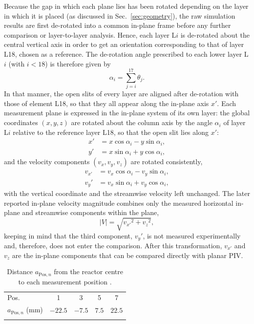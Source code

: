 Because the gap in which each plane lies has been rotated depending on the layer in which it is placed (as discussed in Sec.~\ref{sec:geometry}), the raw simulation results are first de-rotated into a common in-plane frame before any further comparison or layer-to-layer analysis. Hence, each layer L$i$ is de-rotated about the central vertical axis in order to get an orientation corresponding to that of layer L18, chosen as a reference. The de-rotation angle prescribed to each lower layer L$i$ (with $i<18$) is therefore given by
\begin{equation}
    \alpha_i = \sum_{j=i}^{17}\theta_j.
    \label{eq:derotation}
\end{equation}
In that manner, the open slits of every layer are aligned after de-rotation with those of element L18, so that they all appear along the in-plane axis $x'$.
Each measurement plane is expressed in the in-plane system of its own layer: the global coordinates $(x,y,z)$ are rotated about the column axis by the angle $\alpha_i$ of layer L$i$ relative to the reference layer L18, so that the open slit lies along $x'$:
\begin{subequations}
\label{eq:transform}
\begin{align}
    x' &= x\cos\alpha_i - y\sin\alpha_i, \\
    y' &= x\sin\alpha_i + y\cos\alpha_i,
\end{align}
\end{subequations}
and the velocity components $(v_x, v_y, v_z)$ are rotated consistently,
\begin{subequations}
\label{eq:transform_vel}
\begin{align}
    v_{x'} &= v_x\cos\alpha_i - v_y\sin\alpha_i, \\
    v_y' &= v_x\sin\alpha_i + v_y\cos\alpha_i,
\end{align}
\end{subequations}
with the vertical coordinate and the streamwise velocity left unchanged. The later reported in-plane velocity magnitude combines only the measured horizontal in-plane and streamwise components within the plane,
\begin{equation}
    |V| = \sqrt{ {v_{x'}}^2 + {v_z}^2 },
    \label{eq:velmag}
\end{equation}
keeping in mind that the third component, $v_y'$, is not measured experimentally and, therefore, does not enter the comparison.
After this transformation, $v_{x'}$ and $v_z$ are the in-plane components that can be compared directly with planar PIV.
\begin{table}[tbp]
\caption{Distance $a_{\mathrm{Pos},n}$ from the reactor centre to each measurement
position \cite{velten2026}.}
\label{tab:pos}
\begin{tabular}{lcccc}
\hline\noalign{\smallskip}
Pos. & 1 & 3 & 5 & 7 \\
\noalign{\smallskip}\hline\noalign{\smallskip}
$a_{\mathrm{Pos},n}$ (mm) & $-22.5$ & $-7.5$ & $7.5$ & $22.5$ \\
\noalign{\smallskip}\hline
\end{tabular}
\end{table}

